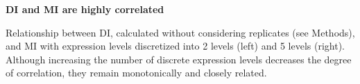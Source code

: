 \caption{\textbf{DI and MI are highly correlated}}
Relationship between DI, calculated without considering replicates (see Methods), and MI with expression levels discretized into 2 levels (left) and 5 levels (right). Although increasing the number of discrete expression levels decreases the degree of correlation, they remain monotonically and closely related.
